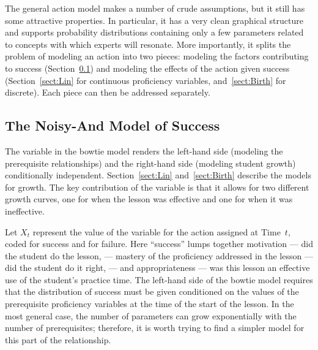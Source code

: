 \documentclass[12pt]{RR-article}
\begin{document}
The general action model makes a number of crude assumptions, but it
still has some attractive properties.  In particular, it has a very
clean graphical structure and supports probability distributions
containing only a few parameters related to concepts with which
experts will resonate.  More importantly, it splits the problem of
modeling an action into two pieces: modeling the factors contributing
to success (Section~\ref{subs:noisyand}) and modeling the effects of
the action given success (Section~\ref{sect:Lin} for continuous
proficiency variables, and~\ref{sect:Birth} for discrete).  Each piece
can then be addressed separately.

\subsection{The Noisy-And Model of Success}
\label{subs:noisyand}

The  variable in the bowtie model renders the left-hand
side (modeling the prerequisite relationships) and the right-hand side
(modeling student growth) conditionally independent.
Section~\ref{sect:Lin} and~\ref{sect:Birth} describe the models for
growth.  The key contribution of the  variable is that
it allows for two different growth curves, one for when the lesson was
effective and one for when it was ineffective.

Let $X_t$ represent the value of the  variable for the
action assigned at Time~$t$, coded  for success and
 for failure.  Here ``success'' lumps together
motivation --- did the student do the lesson, --- mastery of the
proficiency addressed in the lesson --- did the student do it
right, --- and appropriateness --- was this lesson an effective use of the
student's practice time.  The left-hand side of the bowtie model
requires that the distribution of success must be given conditioned on
the values of the prerequisite proficiency variables at the time of
the start of the lesson.  In the most general case, the number of
parameters can grow exponentially with the number of prerequisites;
therefore, it is worth trying to find a simpler model for this part of
the relationship.
\end{document}
